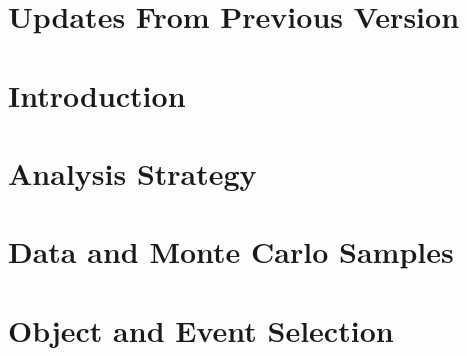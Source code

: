 \documentclass[UKenglish,texlive=2013]{\ATLASLATEXPATH atlasdoc}
\begin{document}
\maketitle

\tableofcontents


\section*{Updates From Previous Version}
\label{todo}



\section{Introduction}
\label{sec:intro}



\section{Analysis Strategy}
\label{sec:strategy}

% 

\section{Data and Monte Carlo Samples}
\label{sec:datamc}


\section{Object and Event Selection}
\label{sec:objevt}

\end{document}
